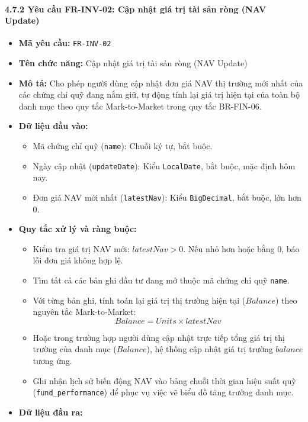 \documentclass[11pt,a4paper]{article}
\providecommand{\tightlist}{
  \setlength{\itemsep}{0pt}\setlength{\parskip}{0pt}}
\begin{document}
\newpage

\paragraph{4.7.2 Yêu cầu FR-INV-02: Cập nhật giá trị tài sản ròng (NAV
Update)}\label{472-yuxeau-cux1ea7u-fr-inv-02-cux1eadp-nhux1eadt-giuxe1-trux1ecb-tuxe0i-sux1ea3n-ruxf2ng-nav-update}

\begin{itemize}
\tightlist
\item
  \textbf{Mã yêu cầu:} \texttt{FR-INV-02}
\item
  \textbf{Tên chức năng:} Cập nhật giá trị tài sản ròng (NAV Update)
\item
  \textbf{Mô tả:} Cho phép người dùng cập nhật đơn giá NAV thị trường
  mới nhất của các chứng chỉ quỹ đang nắm giữ, tự động tính lại giá trị
  hiện tại của toàn bộ danh mục theo quy tắc Mark-to-Market trong quy
  tắc BR-FIN-06.
\item
  \textbf{Dữ liệu đầu vào:}

  \begin{itemize}
  \tightlist
  \item
    Mã chứng chỉ quỹ (\texttt{name}): Chuỗi ký tự, bắt buộc.
  \item
    Ngày cập nhật (\texttt{updateDate}): Kiểu \texttt{LocalDate}, bắt
    buộc, mặc định hôm nay.
  \item
    Đơn giá NAV mới nhất (\texttt{latestNav}): Kiểu \texttt{BigDecimal},
    bắt buộc, lớn hơn 0.
  \end{itemize}
\item
  \textbf{Quy tắc xử lý và ràng buộc:}

  \begin{itemize}
  \tightlist
  \item
    Kiểm tra giá trị NAV mới: \(latestNav > 0\). Nếu nhỏ hơn hoặc bằng
    0, báo lỗi đơn giá không hợp lệ.
  \item
    Tìm tất cả các bản ghi đầu tư đang mở thuộc mã chứng chỉ quỹ
    \texttt{name}.
  \item
    Với từng bản ghi, tính toán lại giá trị thị trường hiện tại
    (\(Balance\)) theo nguyên tắc Mark-to-Market:
    \[Balance = Units \times latestNav\]
  \item
    Hoặc trong trường hợp người dùng cập nhật trực tiếp tổng giá trị thị
    trường của danh mục (\(Balance\)), hệ thống cập nhật giá trị trường
    \(balance\) tương ứng.
  \item
    Ghi nhận lịch sử biến động NAV vào bảng chuỗi thời gian hiệu suất
    quỹ (\texttt{fund\_performance}) để phục vụ việc vẽ biểu đồ tăng
    trưởng danh mục.
  \end{itemize}
\item
  \textbf{Dữ liệu đầu ra:}


\end{itemize}
\end{document}
